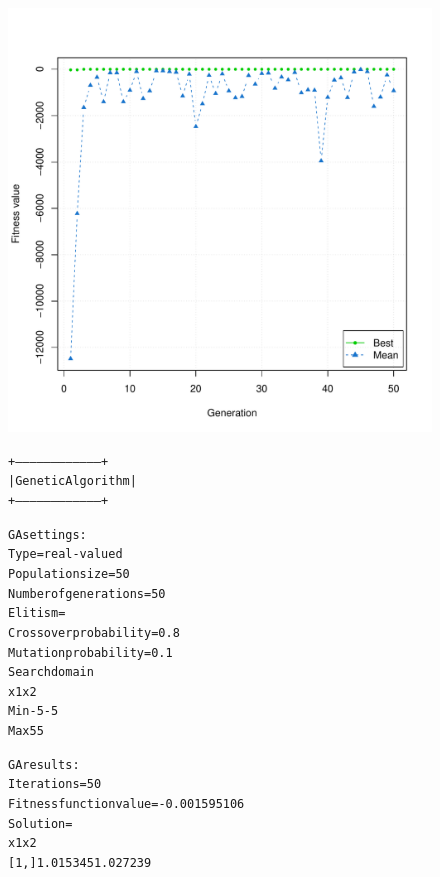\documentclass{article}
\begin{document}
\clearpage

\begin{figure}
	\begin{center}
		\begin{minipage}[h!]{0.66\textwidth}
			\includegraphics[width=1.0\textwidth]{gaConverge3D.pdf}
		\end{minipage}
		\begin{minipage}[h!]{0.33\textwidth}
			\begin{alltt}
			+-----------------------------------+
			|         Genetic Algorithm         |
			+-----------------------------------+
			
			GA settings: 
			Type                  =  real-valued 
			Population size       =  50 
			Number of generations =  50 
			Elitism               =   
			Crossover probability =  0.8 
			Mutation probability  =  0.1 
			Search domain 
			    x1 x2
			Min -5 -5
			Max  5  5
			
			GA results: 
			Iterations             = 50 
			Fitness function value = -0.001595106 
			Solution               = 
			           x1       x2
			[1,] 1.015345 1.027239
			\end{alltt}	
		\end{minipage}
	\end{center}
\end{figure}
\end{document}
